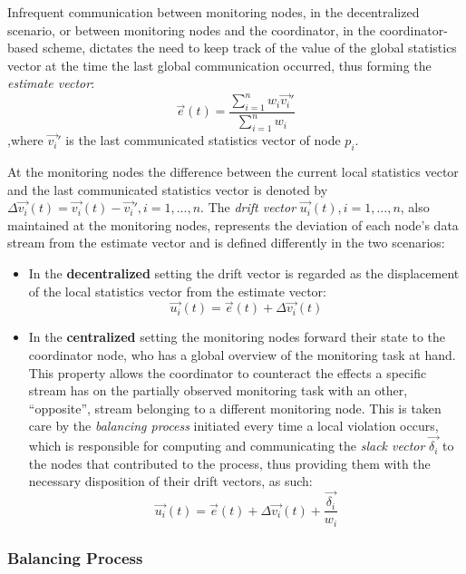 Infrequent communication between monitoring nodes, in the decentralized scenario, or between monitoring nodes and the coordinator, in the coordinator-based scheme, dictates the need to keep track of the value of the global statistics vector at the time the last global communication occurred, thus forming the \emph{estimate vector}:
\begin{equation}
\vec{e}(t)=\frac{\sum_{i=1}^n {w_i \vec{v_i}'}}{\sum_{i=1}^n {w_i}}
\label{form:estimateVector}
\end{equation}
,where $\vec{v_i}'$ is the last communicated statistics vector of node $p_i$.

At the monitoring nodes the difference between the current local statistics vector and the last communicated statistics vector is denoted by $\Delta \vec{v_i}(t)=\vec{v_i}(t)-\vec{v_i}', i=1,\dots,n$. The \emph{drift vector} $\vec{u_i}(t), i=1,\dots,n$, also maintained at the monitoring nodes, represents the deviation of each node's data stream from the estimate vector and is defined differently in the two scenarios:
\begin{itemize}
\item In the \textbf{decentralized} setting the drift vector is regarded as the displacement of the local statistics vector from the estimate vector:
\begin{equation}
\vec{u_i}(t)=\vec{e}(t)+\Delta \vec{v_i}(t)
\label{form:decentralizedDrift}
\end{equation}
\item In the \textbf{centralized} setting the monitoring nodes forward their state to the coordinator node, who has a global overview of the monitoring task at hand. This property allows the coordinator to counteract the effects a specific stream has on the partially observed monitoring task with an other, ``opposite'', stream belonging to a different monitoring node. This is taken care by the \emph{balancing process} initiated every time a local violation occurs, which is responsible for computing and communicating the \emph{slack vector} $\vec{\delta_i}$ to the nodes that contributed to the process, thus providing them with the necessary disposition of their drift vectors, as such:
\begin{equation}
\vec{u_i}(t)=\vec{e}(t)+\Delta \vec{v_i}(t)+\frac{\vec{\delta_i}}{w_i}
\label{form:centralizedDrift}
\end{equation} 
\end{itemize}

\subsubsection{Balancing Process} \label{subsubsec:theorBack-GM-balancingProc}

